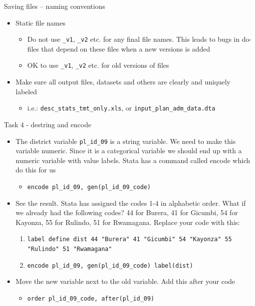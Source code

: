\documentclass[aspectratio=169]{beamer}
\begin{document}
\begin{frame}{Saving files – naming conventions}
	\begin{itemize}
		\item Static file names
		\begin{itemize}
			\item 	Do not use \texttt{\_v1}, \texttt{\_v2} etc. for any final file names. This leads to bugs in do-files that depend on these files when a new versions is added
			\item OK to use \texttt{\_v1}, \texttt{\_v2} etc. for old versions of files
		\end{itemize}
		\item Make sure all output files, datasets and others are clearly and uniquely labeled
		\begin{itemize}
			\item  i.e.: \texttt{desc\_stats\_tmt\_only.xls}, or \texttt{input\_plan\_adm\_data.dta}
		\end{itemize}
	\end{itemize}
\end{frame}

\begin{frame}{Task 4 - destring and encode}
	\begin{itemize}
		\item The district variable \texttt{pl\_id\_09} is a string variable. We need to make this variable numeric. Since it is a categorical variable we should end up with a numeric variable with value labels. Stata has a command called encode which do this for us
		\begin{itemize}
			\item \texttt{encode  pl\_id\_09,  gen(pl\_id\_09\_code)}
		\end{itemize}
		\item See the result. Stata has assigned the codes 1-4 in alphabetic order. What if we already had the following codes? 44 for Burera, 41  for Gicumbi, 54 for Kayonza,  55 for Rulindo, 51 for Rwamagana. Replace your code with this:
		\begin{enumerate}
			\item 	\texttt{label define dist 44 "Burera" 41 "Gicumbi" 54 "Kayonza" 55 "Rulindo" 51 "Rwamagana"}
			\item   \texttt{encode  pl\_id\_09,  gen(pl\_id\_09\_code) label(dist)}
		\end{enumerate}
		\item Move the new variable next to the old variable. Add this after your code
		\begin{itemize}
			\item \texttt{order pl\_id\_09\_code, after(pl\_id\_09)}
		\end{itemize}
	\end{itemize}
\end{frame}
\end{document}
